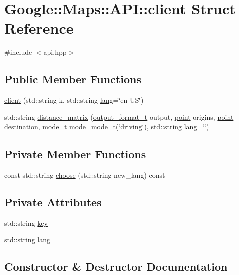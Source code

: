 \hypertarget{a00040}{}\section{Google\+:\+:Maps\+:\+:A\+PI\+:\+:client Struct Reference}
\label{a00040}


{\ttfamily \#include $<$api.\+hpp$>$}

\subsection*{Public Member Functions}
\begin{DoxyCompactItemize}
\item 
\hyperlink{a00040_aa4e453192444e3ed3ae486036e852f03}{client} (std\+::string k, std\+::string \hyperlink{a00040_a4854d3b172e3e823b647897fe8b24f44}{lang}=\char`\"{}en-\/US\char`\"{})
\item 
std\+::string \hyperlink{a00040_a2167437cf0c3cdc7fa9e9c70643a27f4}{distance\+\_\+matrix} (\hyperlink{a00048}{output\+\_\+format\+\_\+t} output, \hyperlink{a00052}{point} origins, \hyperlink{a00052}{point} destination, \hyperlink{a00044}{mode\+\_\+t} mode=\hyperlink{a00044}{mode\+\_\+t}(\char`\"{}driving\char`\"{}), std\+::string \hyperlink{a00040_a4854d3b172e3e823b647897fe8b24f44}{lang}=\char`\"{}\char`\"{})
\end{DoxyCompactItemize}
\subsection*{Private Member Functions}
\begin{DoxyCompactItemize}
\item 
const std\+::string \hyperlink{a00040_ab9af6c85cf06cff7e2e877c7ed1db179}{choose} (std\+::string new\+\_\+lang) const
\end{DoxyCompactItemize}
\subsection*{Private Attributes}
\begin{DoxyCompactItemize}
\item 
std\+::string \hyperlink{a00040_a81829bbeb30b8931e2929a3d9815045b}{key}
\item 
std\+::string \hyperlink{a00040_a4854d3b172e3e823b647897fe8b24f44}{lang}
\end{DoxyCompactItemize}


\subsection{Constructor \& Destructor Documentation}
\mbox{\label{a00040_aa4e453192444e3ed3ae486036e852f03}} 
